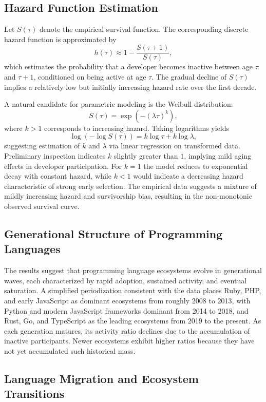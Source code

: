 \documentclass[12pt,a4paper]{article}
\begin{document}
\subsection{Hazard Function Estimation}

Let $S(\tau)$ denote the empirical survival function. The corresponding discrete hazard function is approximated by
\[
h(\tau) \approx 1 - \frac{S(\tau+1)}{S(\tau)},
\]
which estimates the probability that a developer becomes inactive between age $\tau$ and $\tau+1$, conditioned on being active at age $\tau$. The gradual decline of $S(\tau)$ implies a relatively low but initially increasing hazard rate over the first decade.

A natural candidate for parametric modeling is the Weibull distribution:
\[
S(\tau) = \exp\!\left( -(\lambda \tau)^k \right),
\]
where $k > 1$ corresponds to increasing hazard. Taking logarithms yields
\[
\log(-\log S(\tau)) = k \log \tau + k \log \lambda,
\]
suggesting estimation of $k$ and $\lambda$ via linear regression on transformed data. Preliminary inspection indicates $k$ slightly greater than $1$, implying mild aging effects in developer participation. For $k = 1$ the model reduces to exponential decay with constant hazard, while $k < 1$ would indicate a decreasing hazard characteristic of strong early selection. The empirical data suggests a mixture of mildly increasing hazard and survivorship bias, resulting in the non-monotonic observed survival curve.

\subsection{Generational Structure of Programming Languages}

The results suggest that programming language ecosystems evolve in generational waves, each characterized by rapid adoption, sustained activity, and eventual saturation. A simplified periodization consistent with the data places Ruby, PHP, and early JavaScript as dominant ecosystems from roughly 2008 to 2013, with Python and modern JavaScript frameworks dominant from 2014 to 2018, and Rust, Go, and TypeScript as the leading ecosystems from 2019 to the present. As each generation matures, its activity ratio declines due to the accumulation of inactive participants. Newer ecosystems exhibit higher ratios because they have not yet accumulated such historical mass.

\subsection{Language Migration and Ecosystem Transitions}
\end{document}

